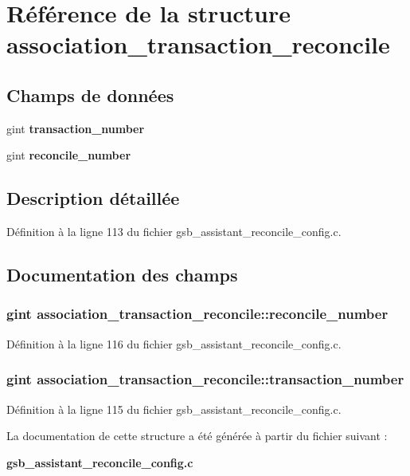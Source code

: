 \section{Référence de la structure association\_\-transaction\_\-reconcile}
\label{structassociation__transaction__reconcile}
\subsection*{Champs de données}
\begin{DoxyCompactItemize}
\item 
gint {\bf transaction\_\-number}
\item 
gint {\bf reconcile\_\-number}
\end{DoxyCompactItemize}


\subsection{Description détaillée}


Définition à la ligne 113 du fichier gsb\_\-assistant\_\-reconcile\_\-config.c.



\subsection{Documentation des champs}
\subsubsection[{reconcile\_\-number}]{\setlength{\rightskip}{0pt plus 5cm}gint {\bf association\_\-transaction\_\-reconcile::reconcile\_\-number}}\label{structassociation__transaction__reconcile_a101d70fbc74c4606a52387969f45300a}


Définition à la ligne 116 du fichier gsb\_\-assistant\_\-reconcile\_\-config.c.

\subsubsection[{transaction\_\-number}]{\setlength{\rightskip}{0pt plus 5cm}gint {\bf association\_\-transaction\_\-reconcile::transaction\_\-number}}\label{structassociation__transaction__reconcile_a70c85b9c95eb1e9ca97a5182b131b90e}


Définition à la ligne 115 du fichier gsb\_\-assistant\_\-reconcile\_\-config.c.



La documentation de cette structure a été générée à partir du fichier suivant :\begin{DoxyCompactItemize}
\item 
{\bf gsb\_\-assistant\_\-reconcile\_\-config.c}\end{DoxyCompactItemize}
